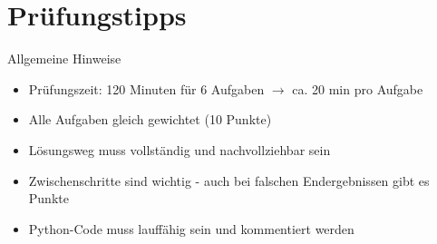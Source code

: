 \section{Prüfungstipps}

\begin{concept}{Allgemeine Hinweise}
\begin{itemize}
    \item Prüfungszeit: 120 Minuten für 6 Aufgaben $\rightarrow$ ca. 20 min pro Aufgabe
    \item Alle Aufgaben gleich gewichtet (10 Punkte)
    \item Lösungsweg muss vollständig und nachvollziehbar sein
    \item Zwischenschritte sind wichtig - auch bei falschen Endergebnissen gibt es Punkte
    \item Python-Code muss lauffähig sein und kommentiert werden
\end{itemize}
\end{concept}

